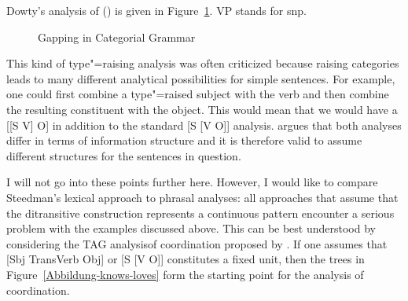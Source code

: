 \begin{exe}
\begin{xlist}[iv.]
\begin{exe}
\begin{xlist}[iv.]
\noindent
Dowty's analysis of () is given in Figure~\ref{Abb-CG-Gapping}. VP stands for s\bs np.
\begin{figure}
\caption{\label{Abb-CG-Gapping}Gapping in Categorial Grammar}
\end{figure}%

This kind of type"=raising analysis was often criticized because raising categories leads to many different analytical possibilities
for simple sentences. For example, one could first combine a type"=raised subject with the verb and then combine the resulting constituent
with the object. This would mean that we would have a [[S V]
O] in addition to the standard [S [V O]] analysis.
\citet{Steedman91a} argues that both analyses differ in terms of information structure and it is therefore valid to assume different structures
for the sentences in question.

I will not go into these points further here. However, I would like to compare Steedman's lexical approach to phrasal analyses: all approaches
that assume that the ditransitive construction represents a continuous pattern encounter a serious problem with the examples discussed above. This
can be best understood by considering the TAG analysis\indextag of coordination proposed by \citet{SJ96a}.
If one assumes that [Sbj TransVerb Obj] or [S [V O]] constitutes a fixed unit, then the trees in
Figure~\vref{Abbildung-knows-loves} form the starting point for the analysis of coordination. 


\end{xlist}
\end{exe}
\end{xlist}
\end{exe}

